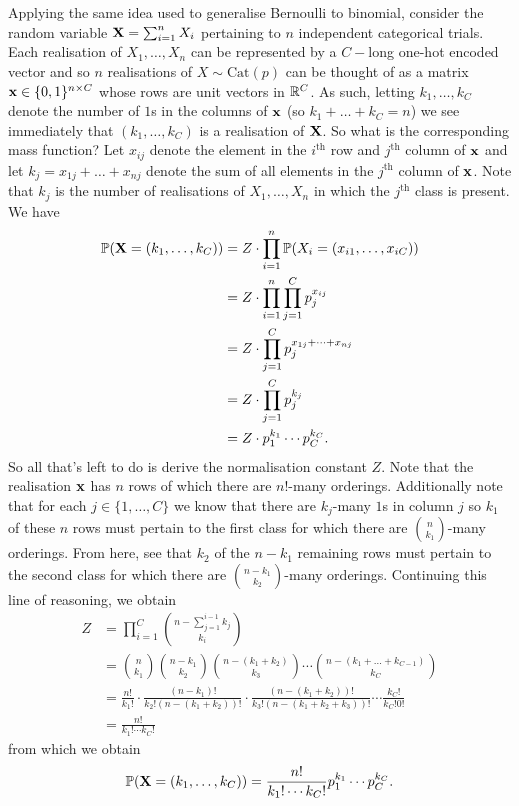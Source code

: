 \documentclass[11pt]{article}
\begin{document}
\begin{appendices}
Applying the same idea used to generalise Bernoulli to binomial, consider the random variable $\mathbf{X}=\sum_{i=1}^nX_i$ pertaining to $n$ independent categorical trials. Each realisation of $X_1,\dots,X_n$ can be represented by a $C-$long one-hot encoded vector and so $n$ realisations of $X\sim\text{Cat}(p)$ can be thought of as a matrix $\mathbf{x}\in\{0,1\}^{n\times C}$ whose rows are unit vectors in $\mathbb{R}^C$. As such, letting $k_1,\dots,k_C$ denote the number of $1$s in the columns of $\mathbf{x}$ (so $k_1+\dots+k_C=n$) we see immediately that $(k_1,\dots,k_C)$ is a realisation of $\mathbf{X}$. So what is the corresponding mass function? Let $x_{ij}$ denote the element in the $i^{\text{th}}$ row and $j^{\text{th}}$ column of $\mathbf{x}$ and let $k_j=x_{1j}+\dots+x_{nj}$ denote the sum of all elements in the $j^{\text{th}}$ column of $\mathbf{x}$. Note that $k_j$ is the number of realisations of $X_1,\dots,X_n$ in which the $j^{\text{th}}$ class is present. We have
\begin{align*}
    \mathbb{P}(\mathbf{X}=(k_1,\dots,k_C))
    &=
    Z\cdot\prod_{i=1}^n\mathbb{P}(X_i=(x_{i1},\dots,x_{iC}))\\
    &=
    Z\cdot\prod_{i=1}^n\prod_{j=1}^Cp_j^{x_{ij}}\\
    &=
    Z\cdot\prod_{j=1}^Cp_j^{x_{1j}+\dots+x_{nj}}\\
    &=
    Z\cdot\prod_{j=1}^Cp_j^{k_j}\\
    &=
    Z\cdot p_1^{k_1}\cdots p_C^{k_C}.
\end{align*}
So all that's left to do is derive the normalisation constant $Z$. Note that the realisation $\mathbf{x}$ has $n$ rows of which there are $n!$-many orderings. Additionally note that for each $j\in\{1,\dots,C\}$ we know that there are $k_j$-many $1$s in column $j$ so $k_1$ of these $n$ rows must pertain to the first class for which there are $\binom{n}{k_1}$-many orderings. From here, see that $k_2$ of the $n-k_1$ remaining rows must pertain to the second class for which there are $\binom{n-k_1}{k_2}$-many orderings. Continuing this line of reasoning, we obtain
\begin{align*}
    Z
    &=
    \prod_{i=1}^C\binom{n-\sum_{j=1}^{i-1}k_j}{k_i}\\
    &=
    \binom{n}{k_1}\binom{n-k_1}{k_2}\binom{n-(k_1+k_2)}{k_3}\cdots\binom{n-(k_1+\dots+k_{C-1})}{k_C}\\
    &=
    \frac{n!}{k_1!}\cdot\frac{(n-k_1)!}{k_2!(n-(k_1+k_2))!}\cdot\frac{(n-(k_1+k_2))!}{k_3!(n-(k_1+k_2+k_3))!}\cdots\frac{k_C!}{k_C!0!}\\
    &=
    \frac{n!}{k_1!\cdots k_C!}
\end{align*}
from which we obtain
$$
\mathbb{P}(\mathbf{X}=(k_1,\dots,k_C))
=
\frac{n!}{k_1!\cdots k_C!}p_1^{k_1}\cdots p_C^{k_C}.
$$


\end{appendices}
\end{document}
